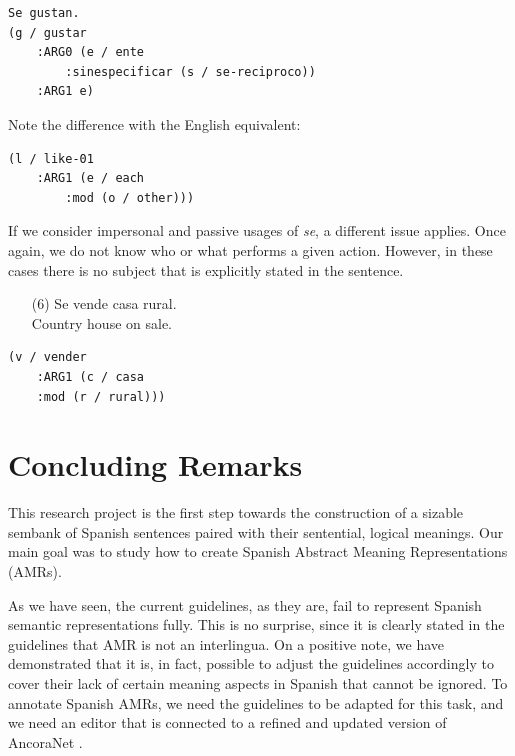 \documentclass[10pt, a4paper]{article}
\begin{document}
{\begin{verbatim}
Se gustan.
(g / gustar
    :ARG0 (e / ente
        :sinespecificar (s / se-reciproco))
    :ARG1 e)
\end{verbatim}

Note the difference with the English equivalent:

\begin{verbatim}
(l / like-01
    :ARG1 (e / each
        :mod (o / other)))
\end{verbatim}

If we consider impersonal and passive usages of \emph{se}, a different issue applies. Once again, we do not know who or what performs a given action. However, in these cases there is no subject that is explicitly stated in the sentence.

\begin{enumerate}
\item[(6)]Se vende casa rural.\\
Country house on sale.
\end{enumerate}

\begin{verbatim}
(v / vender
    :ARG1 (c / casa
    :mod (r / rural)))
\end{verbatim}



\section{Concluding Remarks}

This research project is the first step towards the construction of a sizable sembank of Spanish sentences paired with their sentential, logical meanings. Our main goal was to study how to create Spanish Abstract Meaning Representations (AMRs).

As we have seen, the current guidelines, as they are, fail to represent Spanish semantic representations fully. This is no surprise, since it is clearly stated in the guidelines that AMR is not an interlingua. On a positive note, we have demonstrated that it is, in fact, possible to adjust the guidelines accordingly to cover their lack of certain meaning aspects in Spanish that cannot be ignored. To annotate Spanish AMRs, we need the guidelines to be adapted for this task, and we need an editor that is connected to a refined and updated version of AncoraNet \cite{taule2008ancora}.

}
\end{document}
